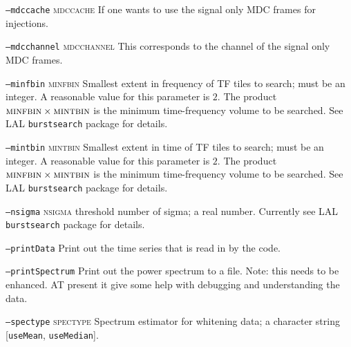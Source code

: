 \begin{entry}
\begin{entry}
\item[\option{--mdc-cache} \parm{cache file}]
\item[\texttt{--mdccache} \textsc{mdccache}] If one wants to use the 
signal only MDC frames for injections.

\item[\option{--mdc-channel} \parm{channel name}]
\item[\texttt{--mdcchannel} \textsc{mdcchannel}] This corresponds to 
the channel of the signal only MDC frames. 

\item[\option{--min-freq-bin} \parm{nfbin}]
\item[\texttt{--minfbin} \textsc{minfbin}] Smallest extent in frequency of
TF tiles to search;  must be an integer.  A reasonable value for this
parameter is $2$.   The product $\mbox{\textsc{minfbin}} \times
\mbox{\textsc{mintbin}}$ is the minimum time-frequency volume to be
searched.  See LAL \texttt{burstsearch} package for details.

\item[\option{--min-time-bin} \parm{ntbin}]
\item[\texttt{--mintbin} \textsc{mintbin}] Smallest extent in time of TF
tiles to search;  must be an integer. A reasonable value for this parameter
is $2$.   The product $\mbox{\textsc{minfbin}} \times
\mbox{\textsc{mintbin}}$ is the minimum time-frequency volume to be
searched.  See LAL \texttt{burstsearch} package for details.

\item[\option{--noise-amplitude} \parm{amplitude}]

\item[\option{--nsigma} \parm{sigma}]
\item[\texttt{--nsigma} \textsc{nsigma}] threshold number of sigma; a real
number.  Currently see LAL \texttt{burstsearch} package for details.

\item[\option{--printData}]
\item[\texttt{--printData}] Print out the time series that is read in
by the code.

\item[\option{--printSpectrum}]
\item[\texttt{--printSpectrum}] Print out the power spectrum to a
file.   Note:  this needs to be enhanced.  AT present it give some
help with debugging and understanding the data.

\item[\option{--psd-average-method} \parm{method}]
\item[\texttt{--spectype} \textsc{spectype}] Spectrum estimator for
whitening data;  a character string [\texttt{useMean}, \texttt{useMedian}].


\end{entry}
\end{entry}
